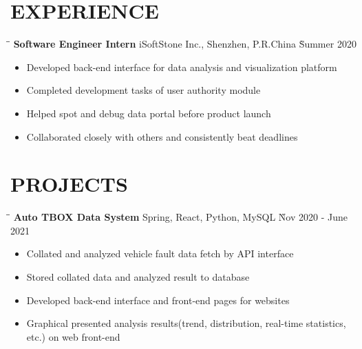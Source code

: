 \documentclass{res}
\begin{document}
\begin{resume}
\section{EXPERIENCE}
    \vspace{-0.1in}	
    \begin{tabbing}
    \hspace{2.3in}\= \hspace{2.6in}\= \kill %
    {\bf Software Engineer Intern} \>iSoftStone Inc., Shenzhen, P.R.China    \` Summer 2020\\
    \end{tabbing}\vspace{-20pt}      %
    \vspace{-0.02in}
    \begin{itemize} \itemsep -2pt %
    \item Developed back-end interface for data analysis and visualization platform
    \item Completed development tasks of user authority module 
    \item Helped spot and debug data portal before product launch
    \item Collaborated closely with others and consistently beat deadlines
    \end{itemize}
   
\vspace{-0.12in}
\section{PROJECTS}

    \vspace{-0.1in}	 
    \begin{tabbing}
    \hspace{3in}\= \hspace{2in}\= \kill %
    {\bf Auto TBOX Data System} \> Spring, React, Python, MySQL \` Nov 2020 - June 2021 \\
    \end{tabbing}\vspace{-20pt}      %
    \begin{itemize} \itemsep -2pt %
    \item Collated and analyzed vehicle fault data fetch by API interface
    \item Stored collated data and analyzed result to database
    \item Developed back-end interface and front-end pages for websites
    \item Graphical presented analysis results(trend, distribution, real-time statistics, etc.) on web front-end
    \end{itemize}


\end{resume}
\end{document}
